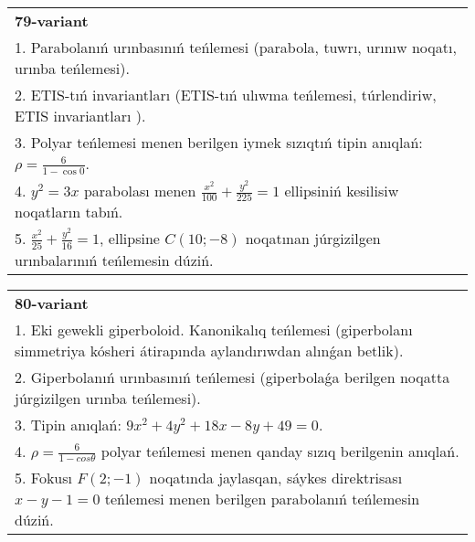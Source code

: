 \documentclass{article}
\begin{document}
\begin{tabular}{m{17cm}}
\textbf{79-variant}\\
1. Parabolanıń urınbasınıń teńlemesi (parabola, tuwrı, urınıw noqatı, urınba teńlemesi).\\

2. ETIS-tıń invariantları (ETIS-tıń ulıwma teńlemesi, túrlendiriw, ETIS invariantları ).\\

3. Polyar teńlemesi menen berilgen iymek sızıqtıń tipin anıqlań: $\rho=\frac{6}{1-\cos 0}$.\\

4. $y^{2} = 3x$ parabolası menen $\frac{x^{2}}{100} + \frac{y^{2}}{225} = 1$ ellipsiniń kesilisiw noqatların tabıń.  \\

5. $\frac{x^{2}}{25} + \frac{y^{2}}{16} = 1$, ellipsine $C(10; - 8)$ noqatınan júrgizilgen urınbalarınıń teńlemesin dúziń.  
\end{tabular}
\vspace{1cm}


\begin{tabular}{m{17cm}}
\textbf{80-variant}\\
1. Eki gewekli giperboloid. Kanonikalıq teńlemesi (giperbolanı simmetriya kósheri átirapında aylandırıwdan alınǵan betlik).\\

2. Giperbolanıń urınbasınıń teńlemesi (giperbolaǵa berilgen noqatta júrgizilgen urınba teńlemesi).\\

3. Tipin anıqlań: $9 x^{2}+4 y^{2}+18 x-8 y+49=0$.\\

4. $\rho = \frac{6}{1 - cos\theta}$ polyar teńlemesi menen qanday sızıq berilgenin anıqlań.  \\

5. Fokusı $F(2; - 1)$ noqatında jaylasqan, sáykes direktrisası $x - y - 1 = 0$ teńlemesi menen berilgen parabolanıń teńlemesin dúziń.  
\end{tabular}
\vspace{1cm}
\end{document}
